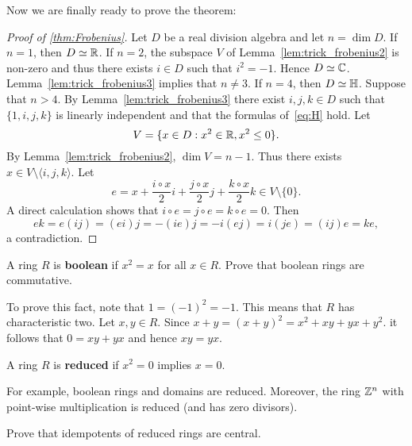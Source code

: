 Now we are finally 
ready to prove the theorem: 

\begin{proof}[Proof of \ref{thm:Frobenius}]
	Let $D$ be a real division algebra and let $n=\dim D$. If $n=1$, then 
	$D\simeq\mathbb{R}$. If $n=2$, the subspace $V$ of Lemma~\ref{lem:trick_frobenius2} 
	is non-zero and thus there exists $i\in D$ such that 
	$i^2=-1$. Hence $D\simeq\mathbb{C}$. Lemma~\ref{lem:trick_frobenius3}
	implies that $n\ne3$. If $n=4$, then $D\simeq\mathbb{H}$. Suppose that 
	$n>4$.  By Lemma~\ref{lem:trick_frobenius3} there exist
	$i,j,k\in D$ such that $\{1,i,j,k\}$ is linearly independent 
	and that the formulas of~\eqref{eq:H} hold. Let 
	\[
		V=\{x\in D:x^2\in\mathbb{R},x^2\leq 0\}.
	\]
	By Lemma~\ref{lem:trick_frobenius2}, $\dim V=n-1$. Thus there exists 
	$x\in V\setminus\langle i,j,k\rangle$. Let 
	\[
		e=x+\frac{i\circ x}{2}i+\frac{j\circ x}{2}j+\frac{k\circ x}{2}k\in V\setminus\{0\}.
	\]
	A direct calculation shows that $i\circ e=j\circ e=k\circ e=0$. Then 
	\[
		ek=e(ij)=(ei)j=-(ie)j=-i(ej)=i(je)=(ij)e=ke,
	\]
	a contradiction. 
\end{proof}




\begin{exercise}
    A ring $R$ is \textbf{boolean} if $x^2=x$ for all $x\in R$. 
    Prove that boolean rings are commutative. 
\end{exercise}

To prove this fact, note that $1=(-1)^2=-1$. This means that $R$ has
characteristic two. Let $x,y\in R$. Since $x+y=(x+y)^2=x^2+xy+yx+y^2$. 
it follows that $0=xy+yx$ and hence $xy=yx$.

\begin{definition}
	A ring $R$ is \textbf{reduced} if $x^2=0$ implies $x=0$. 
\end{definition}

For example, boolean rings and domains are reduced. Moreover, the ring 
$\mathbb{Z}^n$ with point-wise multiplication is reduced (and has zero divisors).

\begin{exercise}
    Prove that idempotents of reduced rings are central. 
\end{exercise}

